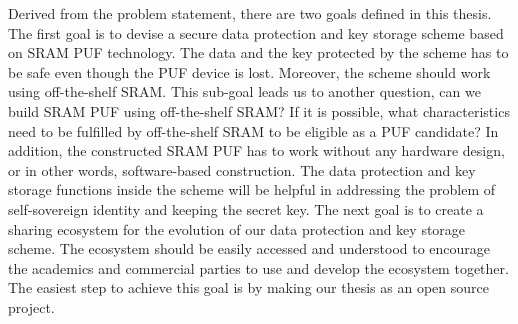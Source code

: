 Derived from the problem statement, there are two goals defined in this thesis. The first goal is to devise a secure data protection and key storage scheme based on SRAM PUF technology. The data and the key protected by the scheme has to be safe even though the PUF device is lost. Moreover, the scheme should work using off-the-shelf SRAM. This sub-goal leads us to another question, can we build SRAM PUF using off-the-shelf SRAM? If it is possible, what characteristics need to be fulfilled by off-the-shelf SRAM to be eligible as a PUF candidate?
In addition, the constructed SRAM PUF has to work without any hardware design, or in other words, software-based construction. The data protection and key storage functions inside the scheme will be helpful in addressing the problem of self-sovereign identity and keeping the secret key.
The next goal is to create a sharing ecosystem for the evolution of our data protection and key storage scheme. The ecosystem should be easily accessed and understood to encourage the academics and commercial parties to use and develop the ecosystem together. The easiest step to achieve this goal is by making our thesis as an open source project.
